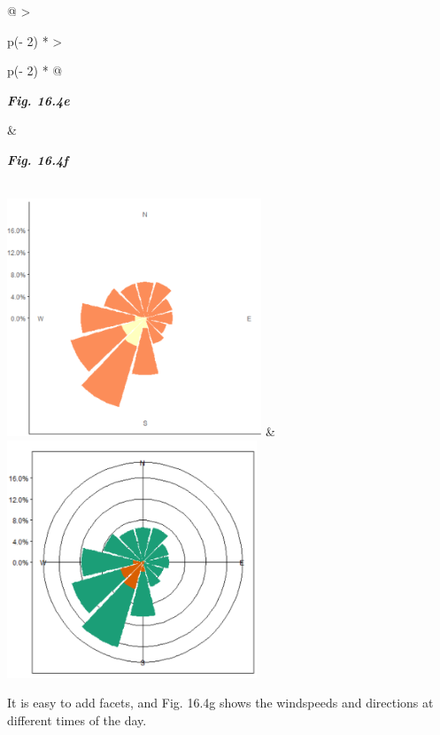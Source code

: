 \documentclass[
  letterpaper,
  DIV=11,
  numbers=noendperiod]{scrreprt}
\begin{document}
\begin{longtable}[]{@{}
  >{\raggedright\arraybackslash}p{(\columnwidth - 2\tabcolsep) * }
  >{\raggedright\arraybackslash}p{(\columnwidth - 2\tabcolsep) * }@{}}
\toprule\noalign{}
\begin{minipage}[b]{\linewidth}\raggedright
\textbf{\emph{Fig. 16.4e}}
\end{minipage} & \begin{minipage}[b]{\linewidth}\raggedright
\textbf{\emph{Fig. 16.4f}}
\end{minipage} \\
\midrule\noalign{}
\endhead
\bottomrule\noalign{}
\endlastfoot
\includegraphics[width=2.99291in,height=2.79423in]{figures/Fig16.4e.png}
&
\includegraphics[width=2.94076in,height=2.78765in]{figures/Fig16.4f.png} \\
\end{longtable}

It is easy to add facets, and Fig. 16.4g shows the windspeeds and
directions at different times of the day.
\end{document}
